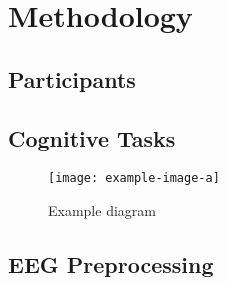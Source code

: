 \setcounter{figure}{0}
\setcounter{table}{0}
\section{Methodology} \label{section:methods} %

\subsection{Participants}
\lipsum[1-2]

\subsection{Cognitive Tasks}
\lipsum[3-4]

\begin{figure}[t]
    \centering
    \caption{Example diagram}
    \texttt{[image: example-image-a]}
    \label{fig:methods}
\end{figure}

\subsection{EEG Preprocessing}
\lipsum[5-6]

